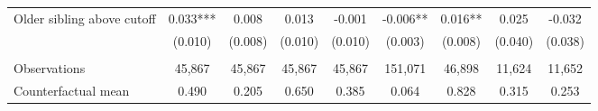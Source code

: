 {{\begin{tabular}{lcccccccc}
Older sibling above cutoff&       0.033***&       0.008   &       0.013   &      -0.001   &      -0.006** &       0.016** &       0.025   &      -0.032   \\
                    &     (0.010)   &     (0.008)   &     (0.010)   &     (0.010)   &     (0.003)   &     (0.008)   &     (0.040)   &     (0.038)   \\
                    &               &               &               &               &               &               &               &               \\
Observations        &      45,867   &      45,867   &      45,867   &      45,867   &     151,071   &      46,898   &      11,624   &      11,652   \\
Counterfactual mean &       0.490   &       0.205   &       0.650   &       0.385   &       0.064   &       0.828   &       0.315   &       0.253   \\
 

\bottomrule
\end{tabular}
}
}
